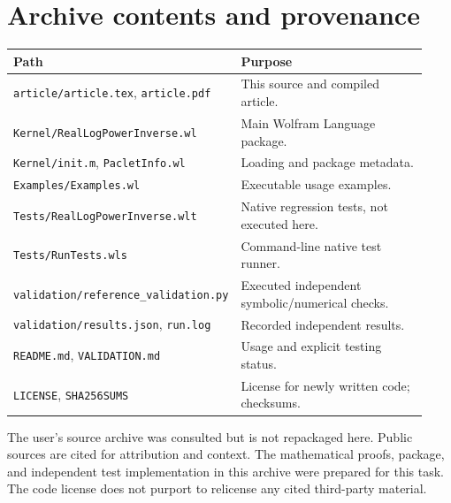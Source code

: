 \documentclass[11pt,a4paper]{article}
\theoremstyle{definition}
\begin{document}
\section{Archive contents and provenance}
\begin{center}
\begin{tabular}{@{}p{0.46\linewidth}p{0.47\linewidth}@{}}
\toprule
Path & Purpose\\\midrule
\texttt{article/article.tex}, \texttt{article.pdf} & This source and compiled article.\\
\texttt{Kernel/RealLogPowerInverse.wl} & Main Wolfram Language package.\\
\texttt{Kernel/init.m}, \texttt{PacletInfo.wl} & Loading and package metadata.\\
\texttt{Examples/Examples.wl} & Executable usage examples.\\
\texttt{Tests/RealLogPowerInverse.wlt} & Native regression tests, not executed here.\\
\texttt{Tests/RunTests.wls} & Command-line native test runner.\\
\texttt{validation/reference\_validation.py} & Executed independent symbolic/numerical checks.\\
\texttt{validation/results.json}, \texttt{run.log} & Recorded independent results.\\
\texttt{README.md}, \texttt{VALIDATION.md} & Usage and explicit testing status.\\
\texttt{LICENSE}, \texttt{SHA256SUMS} & License for newly written code; checksums.\\
\bottomrule
\end{tabular}
\end{center}
The user's source archive was consulted but is not repackaged here. Public
sources are cited for attribution and context. The mathematical proofs,
package, and independent test implementation in this archive were prepared
for this task. The code license does not purport to relicense any cited
third-party material.
\end{document}
